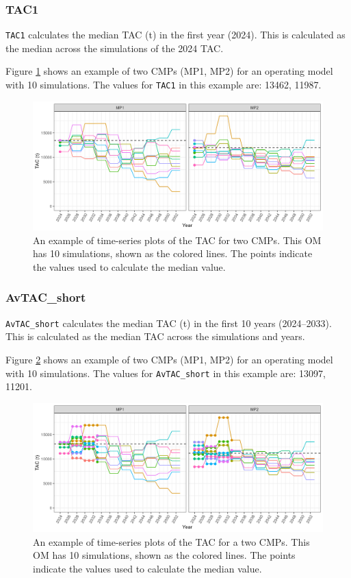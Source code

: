 \documentclass[
]{article}
\begin{document}
\hypertarget{tac1}{%
\subsubsection{TAC1}\label{tac1}}

\texttt{TAC1} calculates the median TAC (t) in the first year (2024). This is calculated as the median across the simulations of the 2024 TAC.

Figure \ref{fig:C1} shows an example of two CMPs (MP1, MP2) for an operating model with 10 simulations. The values for \texttt{TAC1} in this example are: 13462, 11987.

\begin{figure}
\includegraphics[width=37.5in]{../../img/PMs/C1} \caption{An example of time-series plots of the TAC for two CMPs. This OM has 10 simulations, shown as the colored lines. The points indicate the values used to calculate the median value.}\label{fig:C1}
\end{figure}

\hypertarget{avtac_short}{%
\subsubsection{AvTAC\_short}\label{avtac_short}}

\texttt{AvTAC\_short} calculates the median TAC (t) in the first 10 years (2024--2033). This is calculated as the median TAC across the simulations and years.

Figure \ref{fig:AvC10} shows an example of two CMPs (MP1, MP2) for an operating model with 10 simulations. The values for \texttt{AvTAC\_short} in this example are: 13097, 11201.

\begin{figure}
\includegraphics[width=37.5in]{../../img/PMs/AvTAC_short} \caption{An example of time-series plots of the TAC for a two CMPs. This OM has 10 simulations, shown as the colored lines. The points indicate the values used to calculate the median value.}\label{fig:AvC10}
\end{figure}
\end{document}

